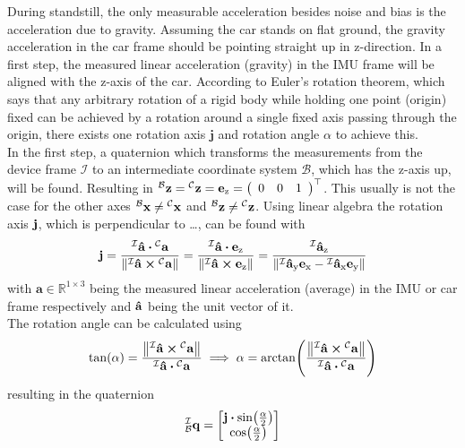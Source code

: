 During standstill, the only measurable acceleration besides noise and bias is the acceleration due to gravity.
Assuming the car stands on flat ground, the gravity acceleration in the car frame should be pointing straight up in z-direction.
In a first step, the measured linear acceleration (gravity) in the IMU frame will be aligned with the z-axis of the car.
According to Euler's rotation theorem, which says that any arbitrary rotation of a rigid body while holding one point (origin) fixed can be achieved by a rotation around a single fixed axis passing through the origin, there exists one rotation axis $\mathbf{j}$ and rotation angle $\alpha$ to achieve this.\\
In the first step, a quaternion  which transforms the measurements from the device frame $\mathcal{I}$ to an intermediate coordinate system $\mathcal{B}$, which has the z-axis up, will be found.
Resulting in $\vincs{z}{b} = \vincs{z}{c} = \mathbf{e}_\mathrm{z} = \left(\begin{array}{lll} 0 & 0 & 1 \end{array}\right)^{\top}$.
This usually is not the case for the other axes $\vincs{x}{b}\neq\vincs{x}{c}$ and $\vincs{z}{b}\neq\vincs{z}{c}$.
Using linear algebra  the rotation axis $\vb{j}$, which is perpendicular to \dots, can be found with
\begin{equation}
    \vb{j} = \frac{\vincs{\vu{a}}{i} \vdot \vincs{a}{c}}{\norm{\vincs{\vu{a}}{i} \cp \vincs{a}{c}}}
    = \frac{\vincs{\vu{a}}{i} \vdot \vb{e}_\mathrm{z} }{\norm{\vincs{\vu{a}}{i} \cp \vb{e}_\mathrm{z}}}
    = \frac{\vincs{\vu{a}_\mathrm{z}}{i}}{\norm{\vincs{\vu{a}_\mathrm{y}}{i}\vb{e}_\mathrm{x} - \vincs{\vu{a}_\mathrm{x}}{i}\vb{e}_\mathrm{y}}}
\end{equation}
with $\mathbf{a} \in \mathbb{R}^{1\times3}$ being the measured linear acceleration (average) in the IMU or car frame respectively and $\vu{a}$ being the unit vector of it.\\
The rotation angle can be calculated using
\begin{equation}
    \tan(\alpha) = \frac{\norm{\vincs{\vu{a}}{i} \cp \vincs{a}{c}}}{\vincs{\vu{a}}{i} \vdot \vincs{a}{c}} \implies
    \alpha = \arctan(\frac{\norm{\vincs{\vu{a}}{i} \cp \vincs{a}{c}}}{\vincs{\vu{a}}{i} \vdot \vincs{a}{c}})
\end{equation}
resulting in the quaternion
\begin{equation}
    \qtf{i}{b} =
    \begin{bmatrix}
        \vb{j}\vdot\sin(\frac{\alpha}{2}) \\
        \cos(\frac{\alpha}{2})
    \end{bmatrix}
\end{equation}


